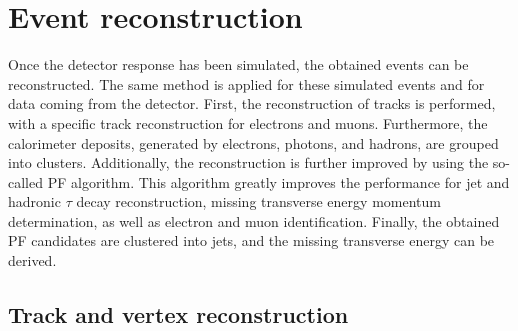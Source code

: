 \section{Event reconstruction}
\label{sec:reconstruction}

Once the detector response has been simulated, the obtained events can be reconstructed. The same method is applied for these simulated events and for data coming from the detector. First, the reconstruction of tracks is performed, with a specific track reconstruction for electrons and muons. Furthermore, the calorimeter deposits, generated by electrons, photons, and hadrons, are grouped into clusters. Additionally, the reconstruction is further improved by using the so-called \acf{PF} algorithm. This algorithm greatly improves the performance for jet and hadronic $\tau$ decay reconstruction, missing transverse energy momentum determination, as well as electron and muon identification. Finally, the obtained \ac{PF} candidates are clustered into jets, and the missing transverse energy can be derived.

\subsection{Track and vertex reconstruction}
\label{sec:tracking}


